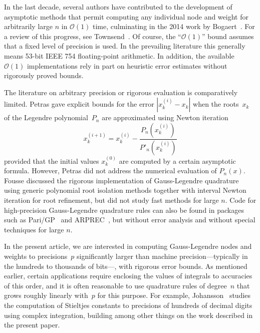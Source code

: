 \documentclass[nohypdvips,review]{siamart0216}
\newcommand{\OO}{\mathcal{O}}
\begin{document}
In the last decade, several authors have contributed to
the development of asymptotic methods
that permit computing any individual node and weight for arbitrarily large $n$
in $\OO(1)$ time, culminating in the 2014 work by
Bogaert~\cite{Bogaert2012,hale2013fast,bogaert2014iteration}.
For a review of this progress, see Townsend~\cite{townsend2015race}.
Of course, the ``$\OO(1)$'' bound assumes that a fixed
level of precision is used. In the prevailing literature
this generally means 53-bit IEEE 754 floating-point arithmetic.
In addition, the available $\OO(1)$ implementations rely in part
on heuristic error estimates without rigorously proved bounds.

The literature on arbitrary precision or rigorous evaluation
is comparatively limited.
Petras \cite{petras1999computation} gave explicit
bounds for the error $|x_k^{(i)} - x_k|$ when
the roots $x_k$ of the Legendre polynomial $P_n$
are approximated using Newton iteration
\begin{equation}
\label{eq:newton}
x^{(i+1)}_k = x^{(i)}_k - \frac{P_n(x^{(i)}_k)}{P'_n(x^{(i)}_k)}
\end{equation}
provided that the initial values $x^{(0)}_k$
are computed by a certain asymptotic formula.
However, Petras did not address the numerical evaluation of $P_n(x)$.
Fousse \cite{fousse2007accurate} discussed the rigorous implementation
of Gauss-Legendre quadrature
using generic polynomial root isolation methods together with
interval Newton iteration
for root refinement,
but did not study fast methods for large $n$.
Code for high-precision Gauss-Legendre quadrature rules can also be found
in packages such as Pari/GP~\cite{PARI2}
and ARPREC~\cite{bailey2002arprec}, but without error analysis
and without special techniques for large $n$.

In the present article, we are interested in computing Gauss-Legendre
nodes and weights to precisions~$p$ significantly larger than machine
precision---typically in the hundreds to thousands of bits---, with
rigorous error bounds.
As mentioned earlier, certain applications require enclosing the values
of integrals to accuracies of this order,
and it is often reasonable to use quadrature rules of degree~$n$ that
grows roughly linearly with~$p$ for this purpose.
For example, Johansson~\cite{Johansson2018a}
studies the computation of Stieltjes constants to precisions
of hundreds of decimal digits using complex integration, building among
other things on the work described in the present paper.
\end{document}
